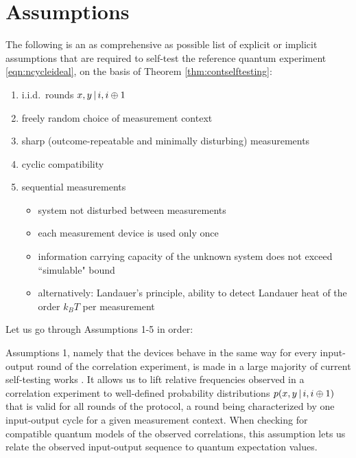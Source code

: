 \section{Assumptions}
\label{sec:kscontass}
The following is an as comprehensive as possible list of explicit or implicit assumptions that are required to self-test the reference quantum experiment \ref{eqn:ncycleideal}, on the basis of Theorem \ref{thm:contselftesting}:
\begin{enumerate}
    \item i.i.d.\ rounds $x,y \thinspace\vert\thinspace i,i\oplus 1$
    \item freely random choice of measurement context
    \item sharp (outcome-repeatable and minimally disturbing) measurements 
    \item cyclic compatibility
    \item sequential measurements
    \begin{itemize}
        \item system not disturbed between measurements
        \item each measurement device is used only once
        \item information carrying capacity of the unknown system does not exceed ``simulable" bound
        \item alternatively: Landauer's principle, ability to detect Landauer heat of the order $k_B T$ per measurement
    \end{itemize}
\end{enumerate}

Let us go through Assumptions 1-5 in order:

Assumptions 1, namely that the devices behave in the same way for every input-output round of the correlation experiment, is made in a large majority of current self-testing works \cite{Supic2020}. It allows us to lift relative frequencies observed in a correlation experiment to well-defined probability distributions $p(x,y\thinspace\vert\thinspace i, i\oplus 1)$ that is valid for all rounds of the protocol, a round being characterized by one input-output cycle for a given measurement context. When checking for compatible quantum models of the observed correlations, this assumption lets us relate the observed input-output sequence to quantum expectation values.

